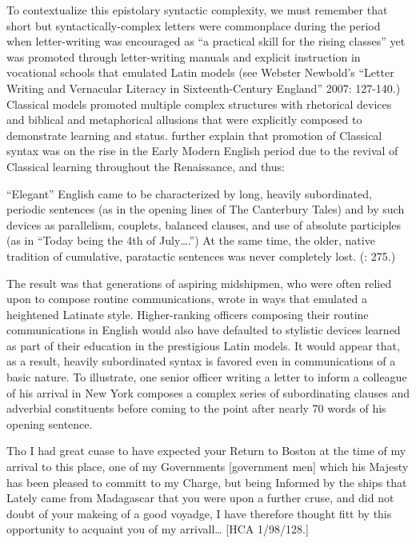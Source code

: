 To contextualize this epistolary syntactic complexity, we must remember that short but syntactically-complex letters were commonplace during the period when letter-writing was encouraged as “a practical skill for the rising classes” \citep[178,]{Mitchell2007} yet was promoted through letter-writing manuals and explicit instruction in vocational schools that emulated Latin models (see Webster Newbold’s “Letter Writing and Vernacular Literacy in Sixteenth-Century England” 2007: 127-140.) Classical models promoted multiple complex structures with rhetorical devices and biblical and metaphorical allusions that were explicitly composed to demonstrate learning and status. \citet{MillwardHayes2012} further explain that promotion of Classical syntax was on the rise in the Early Modern English period due to the revival of Classical learning throughout the Renaissance, and thus:

“Elegant” English came to be characterized by long, heavily subordinated, periodic sentences (as in the opening lines of The Canterbury Tales) and by such devices as parallelism, couplets, balanced clauses, and use of absolute participles (as in “Today being the 4th of July….”) At the same time, the older, native tradition of cumulative, paratactic sentences was never completely lost. (\citealt{MillwardHayes2012}: 275.)

The result was that generations of aspiring midshipmen, who were often relied upon to compose routine communications, wrote in ways that emulated a heightened Latinate style. Higher-ranking officers composing their routine communications in English would also have defaulted to stylistic devices learned as part of their education in the prestigious Latin models. It would appear that, as a result, heavily subordinated syntax is favored even in communications of a basic nature. To illustrate, one senior officer writing a letter to inform a colleague of his arrival in New York composes a complex series of subordinating clauses and adverbial constituents before coming to the point after nearly 70 words of his opening sentence.

Tho I had great cuase to have expected your Return to Boston at the time of my arrival to this place, one of my Governments [government men] which his Majesty has been pleased to committ to my Charge, but being Informed by the ships that Lately came from Madagascar that you were upon a further cruse, and did not doubt of your makeing of a good voyadge, I have therefore thought fitt by this opportunity to acquaint you of my arrivall… [HCA 1/98/128.]

